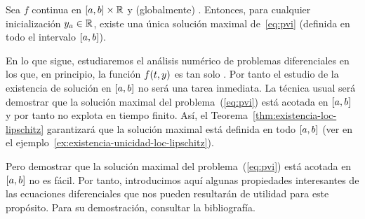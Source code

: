 \begin{theorem}%
  \label{thm:existencia-unif-lipschitz}
  Sea $f$ continua en $[\ta,\tb]\times\Rset$ y (globalmente) \globLipschitz.
  Entonces, para cualquier inicialización $\ycero\in\Rset$, existe una
  única solución maximal de~\eqref{eq:pvi} (definida en todo el
  intervalo $[\ta,\tb]$).%
\end{theorem}


En lo que sigue, estudiaremos el análisis numérico de problemas
diferenciales en los que, en principio, la función $f(\tt,y)$ es tan
solo \locLipschitz. Por tanto el estudio de la existencia de solución
en $[\ta,\tb]$ no será una tarea inmediata. La técnica usual será
demostrar que la solución maximal del problema~(\ref{eq:pvi}) está
acotada en $[\ta,\tb]$ y por tanto no explota en tiempo finito. Así,
el Teorema~\ref{thm:existencia-loc-lipschitz} garantizará que la
solución maximal está definida en todo $[\ta,\tb]$ (ver en el
ejemplo~\ref{ex:existencia-unicidad-loc-lipschitz}).

Pero demostrar que la solución maximal del problema~(\ref{eq:pvi})
está acotada en $[\ta,\tb]$ no es fácil. Por tanto, introducimos aquí
algunas propiedades interesantes de las ecuaciones diferenciales que
nos pueden resultarán de utilidad para este propósito. Para su
demostración, consultar la bibliografía.

